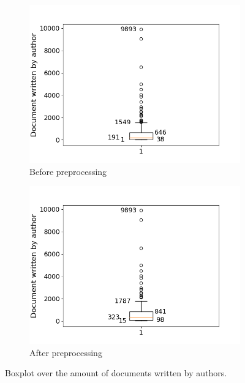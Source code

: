 \begin{figure}[ht]
	\centering
	\begin{subfigure}{0.45\textwidth}
		\centering
		\includegraphics[width=\linewidth]{figures/author_box_before.png}
		\caption{Before preprocessing}
		\label{fig:author_box_before}
	\end{subfigure}
	\begin{subfigure}{0.45\textwidth}
		\centering
		\includegraphics[width=\linewidth]{figures/author_box_14.png}
		\caption{After preprocessing}
		\label{fig:auhtor_box_after}
	\end{subfigure}
	\caption{Boxplot over the amount of documents written by authors.}
	\label{fig:author_box}
\end{figure}

